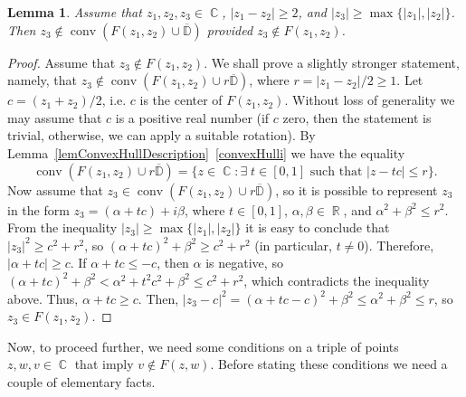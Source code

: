 \documentclass{amsart}
\numberwithin{equation}{section}
\newtheorem{lemma}[theorem]{Lemma}
\theoremstyle{definition}
\theoremstyle{remark}
\DeclareMathOperator{\conv}{conv}
\DeclareMathOperator{\CC}{\mathbb C}
\DeclareMathOperator{\RR}{\mathbb R}
\begin{document}
	\begin{lemma}\label{lemBiggestDoesNotBelongToConvexHull}
		Assume that $z_1,z_2,z_3 \in \CC$, $|z_1 - z_2| \ge 2$, and $|z_3| \ge \max\{|z_1|,|z_2|\}$. Then $z_3 \notin \conv(F(z_1,z_2) \cup \overline{\mathbb D})$ provided $z_3 \notin F(z_1,z_2)$.
	\end{lemma}
	\begin{proof}
		Assume that $z_3 \notin F(z_1,z_2)$. We shall prove a slightly stronger statement, namely, that $z_3 \notin \conv(F(z_1,z_2) \cup r\overline{\mathbb D})$, where $r = |z_1 - z_2|/2 \ge 1$. Let $c = (z_1 + z_2)/2$, i.e. $c$ is the center of $F(z_1,z_2)$. Without loss of generality we may assume that $c$ is a positive real number (if $c$ zero, then the statement is trivial, otherwise, we can apply a suitable rotation). By Lemma~\ref{lemConvexHullDescription}~\ref{convexHulli} we have the equality
		\[
		\conv(F(z_1,z_2) \cup r\overline{\mathbb D}) = \{z \in \CC: \exists \;t \in [0,1] \text{ such that } |z - tc| \le r\}.
		\]
		Now assume that $z_3 \in \conv(F(z_1,z_2) \cup r\overline{\mathbb D})$, so it is possible to represent $z_3$ in the form $z_3 = (\alpha + tc) + i\beta$, where $t \in [0,1]$, $\alpha, \beta \in \RR$, and $\alpha^2 + \beta^2 \le r^2$. From the inequality $|z_3| \ge \max\{|z_1|,|z_2|\}$ it is easy to conclude that $|z_3|^2 \ge c^2 + r^2$, so
		$(\alpha + tc)^2 + \beta^2 \ge c^2 + r^2$ (in particular, $t\ne 0$). Therefore, $|\alpha + tc| \ge c$. If $\alpha + tc \le -c$, then $\alpha$ is negative, so $(\alpha + tc)^2 + \beta^2 < \alpha^2 + t^2c^2 + \beta^2 \le c^2 + r^2$, which contradicts the inequality above. Thus, $\alpha + tc \ge c$. Then, $|z_3 - c|^2 = (\alpha + tc - c)^2 + \beta^2 \le \alpha^2 + \beta^2 \le r$, so $z_3 \in F(z_1, z_2)$.
	\end{proof}
	
	Now, to proceed further, we need some conditions on a triple of points $z,w,v \in \CC$ that imply $v \notin F(z,w)$. Before stating these conditions we need a couple of elementary facts.
	
\end{document}

